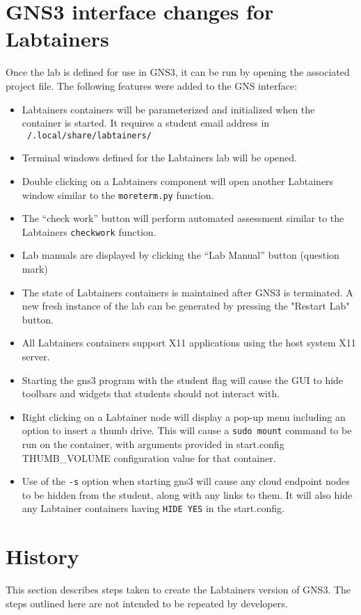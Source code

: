 \documentclass[12pt]{article}
\begin{document}
\section{GNS3 interface changes for Labtainers}
Once the lab is defined for use in GNS3, it can be run by opening the associated project file.  The following features were added to the GNS interface:
\begin{itemize}
	\item Labtainers containers will be parameterized and initialized when the container is started.  It requires a student email address in
		{\tt ~/.local/share/labtainers/}
	\item Terminal windows defined for the Labtainers lab will be opened.
	\item Double clicking on a Labtainers component will open another Labtainers window similar to the {\tt moreterm.py} function.
	\item The ``check work'' button will perform automated assessment similar to the Labtainers {\tt checkwork} function.
	\item Lab manuals are displayed by clicking the ``Lab Manual'' button (question mark)
	\item The state of Labtainers containers is maintained after GNS3 is terminated.  A new fresh instance of the lab can be generated
		by pressing the "Restart Lab" button.
	\item All Labtainers containers support X11 applications using the host system X11 server.
	\item Starting the gns3 program with the \-\-student flag will cause the GUI to hide toolbars and widgets that students should not interact with.
        \item Right clicking on a Labtainer node will display a pop-up menu including an option to insert a thumb drive.  This will cause
              a {\tt sudo mount} command to be run on the container, with arguments provided in start.config THUMB\_VOLUME configuration
              value for that container.
        \item Use of the {\tt -s} option when starting gns3 will cause any cloud endpoint nodes to be hidden from the student,
along with any links to them.  It will also hide any Labtainer containers having {\tt HIDE YES} in the start.config.
\end{itemize}


\section{History}
This section describes steps taken to create the Labtainers version of GNS3.
The steps outlined here are not intended to be repeated by developers.
\end{document}
